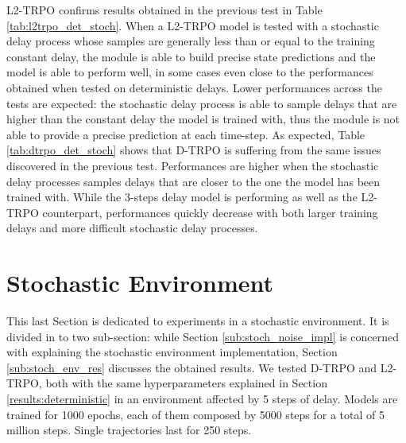                 L2-TRPO confirms results obtained in the previous test in Table \ref{tab:l2trpo_det_stoch}. When a L2-TRPO model is tested with a stochastic delay process whose samples are generally less than or equal to the training constant delay, the module is able to build precise state predictions and the model is able to perform well, in some cases even close to the performances obtained when tested on deterministic delays. Lower performances across the tests are expected: the stochastic delay process is able to sample delays that are higher than the constant delay the model is trained with, thus the module is not able to provide a precise prediction at each time-step. \newline
                As expected, Table \ref{tab:dtrpo_det_stoch} shows that D-TRPO is suffering from the same issues discovered in the previous test. Performances are higher when the stochastic delay processes samples delays that are closer to the one the model has been trained with. While the 3-steps delay model is performing as well as the L2-TRPO counterpart, performances quickly decrease with both larger training delays and more difficult stochastic delay processes.
            
    \newpage
    \section{Stochastic Environment}
    \label{results:stochastic}
        This last Section is dedicated to experiments in a stochastic environment. It is divided in to two sub-section: while Section \ref{sub:stoch_noise_impl} is concerned with explaining the stochastic environment implementation, Section \ref{sub:stoch_env_res} discusses the obtained results. We tested D-TRPO and L2-TRPO, both with the same hyperparameters explained in Section \ref{results:deterministic} in an environment affected by 5 steps of delay. Models are trained for 1000 epochs, each of them composed by 5000 steps for a total of 5 million steps. Single trajectories last for 250 steps. 
        
